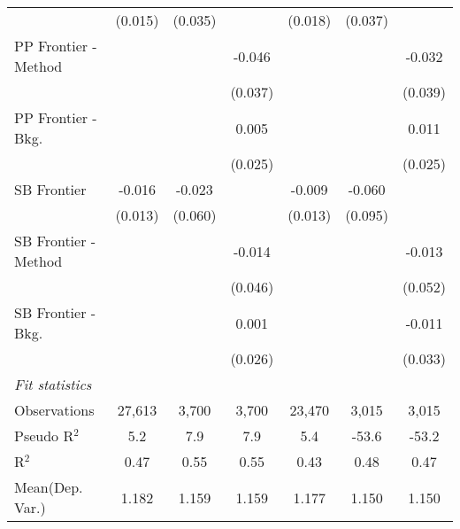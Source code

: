 \begin{tabular}{lcccccc}
                        & (0.015)       & (0.035)     &         & (0.018)       & (0.037)       &   \\   
   PP Frontier - Method &               &             & -0.046  &               &               & -0.032\\   
                        &               &             & (0.037) &               &               & (0.039)\\   
   PP Frontier - Bkg.   &               &             & 0.005   &               &               & 0.011\\   
                        &               &             & (0.025) &               &               & (0.025)\\   
   SB Frontier          & -0.016        & -0.023      &         & -0.009        & -0.060        &   \\   
                        & (0.013)       & (0.060)     &         & (0.013)       & (0.095)       &   \\   
   SB Frontier - Method &               &             & -0.014  &               &               & -0.013\\   
                        &               &             & (0.046) &               &               & (0.052)\\   
   SB Frontier - Bkg.   &               &             & 0.001   &               &               & -0.011\\   
                        &               &             & (0.026) &               &               & (0.033)\\   
   \midrule
   \emph{Fit statistics}\\
   Observations         & 27,613        & 3,700       & 3,700   & 23,470        & 3,015         & 3,015\\  
   Pseudo R$^2$         & 5.2           & 7.9         & 7.9     & 5.4           & -53.6         & -53.2\\  
   R$^2$                & 0.47          & 0.55        & 0.55    & 0.43          & 0.48          & 0.47\\  
Mean(Dep. Var.) & 1.182 & 1.159 & 1.159 & 1.177 & 1.150 & 1.150 \\
   

\end{tabular}
